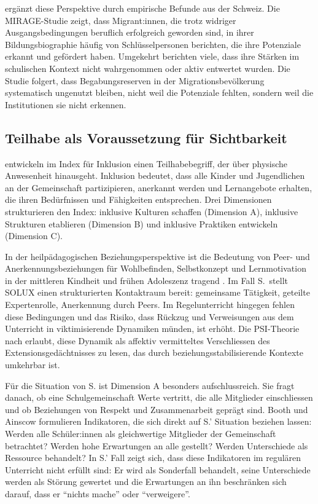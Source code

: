 \documentclass[ngerman, a4paper]{article}
\begin{document}
\textcite{stamm2014mirage} ergänzt diese Perspektive durch empirische Befunde aus der Schweiz. Die
MIRAGE-Studie zeigt, dass Migrant:innen, die trotz widriger Ausgangsbedingungen
beruflich erfolgreich geworden sind, in ihrer Bildungsbiographie häufig von
Schlüsselpersonen berichten, die ihre Potenziale erkannt und gefördert haben. Umgekehrt
berichten viele, dass ihre Stärken im schulischen Kontext nicht wahrgenommen
oder aktiv entwertet wurden. Die Studie folgert, dass Begabungsreserven in der
Migrationsbevölkerung systematisch ungenutzt bleiben, nicht weil die Potenziale
fehlten, sondern weil die Institutionen sie nicht erkennen.

\subsection{Teilhabe als Voraussetzung für Sichtbarkeit}

\textcite[Dim.\,A--C]{booth2019index} entwickeln im Index für Inklusion einen Teilhabebegriff, der über
physische Anwesenheit hinausgeht. Inklusion bedeutet, dass alle Kinder und Jugendlichen
an der Gemeinschaft partizipieren, anerkannt werden und Lernangebote erhalten, die
ihren Bedürfnissen und Fähigkeiten entsprechen. Drei Dimensionen strukturieren den
Index: inklusive Kulturen schaffen (Dimension A), inklusive Strukturen etablieren
(Dimension B) und inklusive Praktiken entwickeln (Dimension C).

In der heilpädagogischen Beziehungsperspektive ist die Bedeutung von Peer-
und Anerkennungsbeziehungen für Wohlbefinden, Selbstkonzept und
Lernmotivation in der mittleren Kindheit und frühen Adoleszenz tragend
\parencite{grossrieder2010anerkennung}. Im Fall S.\ stellt SOLUX
einen strukturierten Kontaktraum bereit: gemeinsame Tätigkeit, geteilte
Expertenrolle, Anerkennung durch Peers. Im Regelunterricht hingegen fehlen
diese Bedingungen und das Risiko, dass Rückzug und Verweisungen aus dem
Unterricht in viktimisierende Dynamiken münden, ist erhöht. Die
PSI-Theorie nach \textcite[S.\,35--57]{kuhl2019diversitaet} erlaubt, diese
Dynamik als affektiv vermitteltes Verschliessen des Extensionsgedächtnisses
zu lesen, das durch beziehungsstabilisierende Kontexte umkehrbar ist.

Für die Situation von S. ist Dimension A besonders aufschlussreich. Sie fragt danach,
ob eine Schulgemeinschaft Werte vertritt, die alle Mitglieder einschliessen und ob
Beziehungen von Respekt und Zusammenarbeit geprägt sind. Booth und Ainscow
formulieren Indikatoren, die sich direkt auf S.' Situation beziehen lassen: Werden alle
Schüler:innen als gleichwertige Mitglieder der Gemeinschaft betrachtet? Werden hohe
Erwartungen an alle gestellt? Werden Unterschiede als Ressource behandelt? In S.' Fall
zeigt sich, dass diese Indikatoren im regulären Unterricht nicht erfüllt sind: Er wird
als Sonderfall behandelt, seine Unterschiede werden als Störung gewertet und die
Erwartungen an ihn beschränken sich darauf, dass er \enquote{nichts mache} oder
\enquote{verweigere}.
\end{document}
